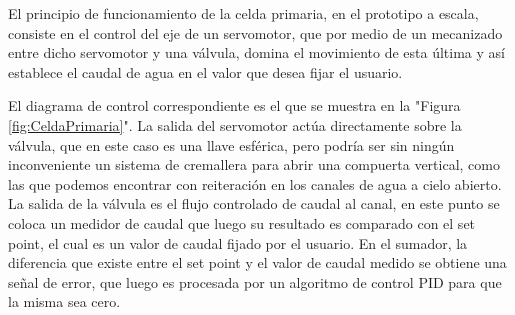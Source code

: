 El principio de funcionamiento de la celda primaria, en el prototipo a escala, consiste en el control del eje de un servomotor, que por medio de un mecanizado entre dicho servomotor y una válvula, domina el movimiento de esta última y así establece el caudal de agua en el valor que desea fijar el usuario.

El diagrama de control correspondiente es el que se muestra en la "Figura \ref{fig:CeldaPrimaria}". La salida del servomotor actúa directamente sobre la válvula, que en este caso es una llave esférica, pero podría ser sin ningún inconveniente un sistema de cremallera para abrir una compuerta vertical, como las que podemos encontrar con reiteración en los canales de agua a cielo abierto. La salida de la válvula es el flujo controlado de caudal al canal, en este punto se coloca un medidor de caudal que luego su resultado es comparado con el set point, el cual es un valor de caudal fijado por el usuario. En el sumador, la diferencia que existe entre el set point y el valor de caudal medido se obtiene una señal de error, que luego es procesada por un algoritmo de control PID para que la misma sea cero.



